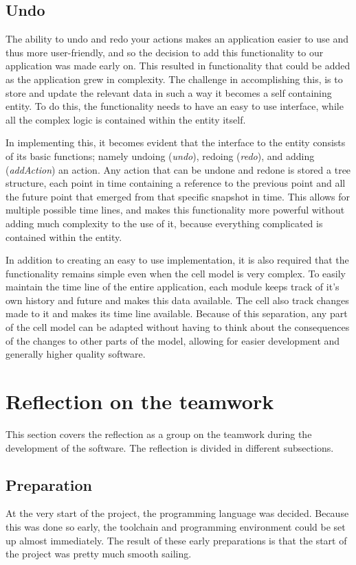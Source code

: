 \documentclass[10pt,a4paper]{report}
\begin{document}
		\subsection{Undo}
			The ability to undo and redo your actions makes an application easier to use and thus more user-friendly, and so the decision to add this functionality to our application was made early on. This resulted in functionality that could be added as the application grew in complexity. The challenge in accomplishing this, is to store and update the relevant data in such a way it becomes a self containing entity. To do this, the functionality needs to have an easy to use interface, while all the complex logic is contained within the entity itself.
			
			In implementing this, it becomes evident that the interface to the entity consists of its basic functions; namely undoing (\emph{undo}), redoing (\emph{redo}), and adding (\emph{addAction}) an action. Any action that can be undone and redone is stored a tree structure, each point in time containing a reference to the previous point and all the future point that emerged from that specific snapshot in time. This allows for multiple possible time lines, and makes this functionality more powerful without adding much complexity to the use of it, because everything complicated is contained within the entity.

			In addition to creating an easy to use implementation, it is also required that the functionality remains simple even when the cell model is very complex. To easily maintain the time line of the entire application, each module keeps track of it's own history and future and makes this data available. The cell also track changes made to it and makes its time line available. Because of this separation, any part of the cell model can be adapted without having to think about the consequences of the changes to other parts of the model, allowing for easier development and generally higher quality software.
	
	\section{Reflection on the teamwork}
		This section covers the reflection as a group on the teamwork during the development of the software. The reflection is divided in different subsections.
		\subsection{Preparation}
			At the very start of the project, the programming language was decided. Because this was done so early, the toolchain and programming environment could be set up almost immediately. The result of these early preparations is that the start of the project was pretty much smooth sailing.
			
\end{document}
